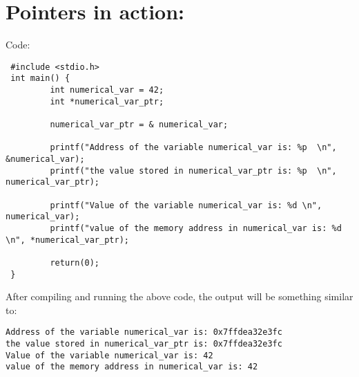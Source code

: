 \section{Pointers in action:}
Code:
\begin{lstlisting} 
 #include <stdio.h>
 int main() {
         int numerical_var = 42;
         int *numerical_var_ptr;

         numerical_var_ptr = & numerical_var;

         printf("Address of the variable numerical_var is: %p  \n", &numerical_var);
         printf("the value stored in numerical_var_ptr is: %p  \n", numerical_var_ptr);

         printf("Value of the variable numerical_var is: %d \n", numerical_var);
         printf("value of the memory address in numerical_var is: %d \n", *numerical_var_ptr);

         return(0);
 }
\end{lstlisting}

After compiling and running the above code, the output will be something similar to:
\begin{lstlisting} 
Address of the variable numerical_var is: 0x7ffdea32e3fc
the value stored in numerical_var_ptr is: 0x7ffdea32e3fc
Value of the variable numerical_var is: 42
value of the memory address in numerical_var is: 42
\end{lstlisting}




